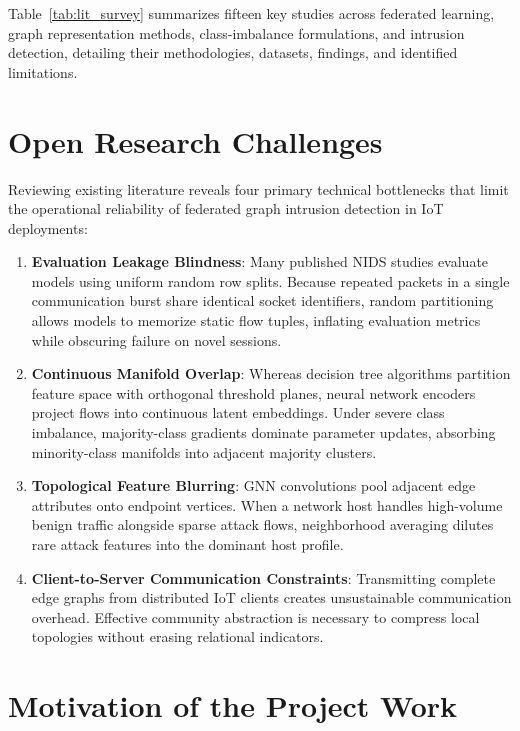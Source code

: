 \documentclass[12pt,a4paper]{report}
\begin{document}
\label{sec:survey_table}

Table~\ref{tab:lit_survey} summarizes fifteen key studies across federated learning, graph representation methods, class-imbalance formulations, and intrusion detection, detailing their methodologies, datasets, findings, and identified limitations.



\section{Open Research Challenges}\label{sec:challenges}

Reviewing existing literature reveals four primary technical bottlenecks that limit the operational reliability of federated graph intrusion detection in IoT deployments:
\begin{enumerate}
    \item \textbf{Evaluation Leakage Blindness}: Many published NIDS studies evaluate models using uniform random row splits. Because repeated packets in a single communication burst share identical socket identifiers, random partitioning allows models to memorize static flow tuples, inflating evaluation metrics while obscuring failure on novel sessions.
    \item \textbf{Continuous Manifold Overlap}: Whereas decision tree algorithms partition feature space with orthogonal threshold planes, neural network encoders project flows into continuous latent embeddings. Under severe class imbalance, majority-class gradients dominate parameter updates, absorbing minority-class manifolds into adjacent majority clusters.
    \item \textbf{Topological Feature Blurring}: GNN convolutions pool adjacent edge attributes onto endpoint vertices. When a network host handles high-volume benign traffic alongside sparse attack flows, neighborhood averaging dilutes rare attack features into the dominant host profile.
    \item \textbf{Client-to-Server Communication Constraints}: Transmitting complete edge graphs from distributed IoT clients creates unsustainable communication overhead. Effective community abstraction is necessary to compress local topologies without erasing relational indicators.
\end{enumerate}

\section{Motivation of the Project Work}\label{sec:motivation}
\end{document}
